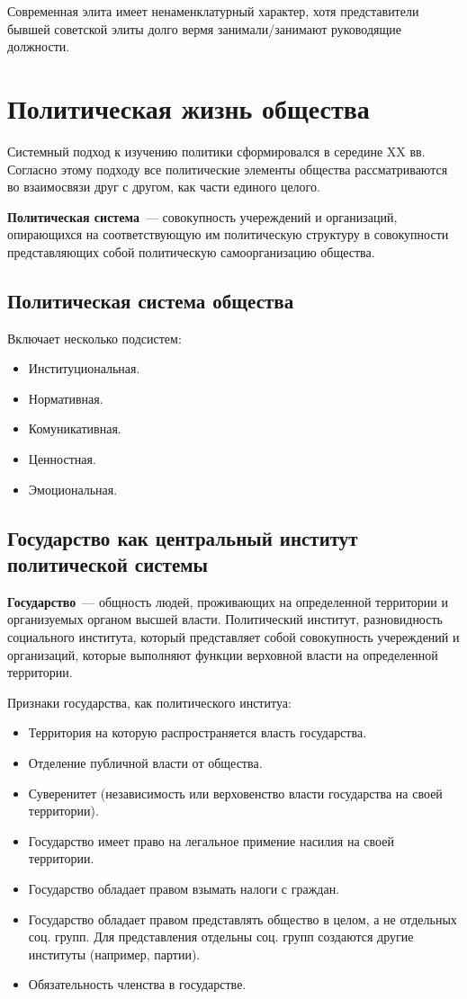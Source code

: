 Современная элита имеет ненаменклатурный характер, хотя представители бывшей советской элиты долго вермя занимали/занимают руководящие должности.

\section{Политическая жизнь общества}
Системный подход к изучению политики сформировался в середине XX вв. Согласно этому подходу все политические элементы общества рассматриваются во взаимосвязи друг с другом, как части единого целого.

\textbf{Политическая система}~--- совокупность учереждений и организаций, опирающихся на соответствующую им политическую структуру в совокупности представляющих собой политическую самоорганизацию общества.
\subsection{Политическая система общества}
Включает несколько подсистем:
\begin{itemize}
	\item Институциональная.
	\item Нормативная.
	\item Комуникативная.
	\item Ценностная.
	\item Эмоциональная.
\end{itemize}
\subsection{Государство как центральный институт политической системы}
\textbf{Государство}~--- общность людей, проживающих на определенной территории и организуемых органом высшей власти. Политический институт, разновидность социального института, который представляет собой совокупность учереждений и организаций, которые выполняют функции верховной власти на определенной территории.

Признаки государства, как политического институа:
\begin{itemize}
	\item Территория на которую распространяется власть государства.
	\item Отделение публичной власти от общества.
	\item Суверенитет (независимость или верховенство власти государства на своей территории).
	\item Государство имеет право на легальное примение насилия на своей территории.
	\item Государство обладает правом взымать налоги с граждан.
	\item Государство обладает правом представлять общество в целом, а не отдельных соц. групп. Для представления отдельны соц. групп создаются другие институты (например, партии).
	\item Обязательность членства в государстве.
\end{itemize}
